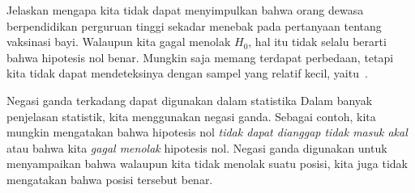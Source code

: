 \begin{examplewrap}
\begin{nexample}{Jelaskan mengapa kita tidak dapat menyimpulkan bahwa
    orang dewasa berpendidikan perguruan tinggi sekadar menebak pada
    pertanyaan tentang vaksinasi bayi.}
  Walaupun kita gagal menolak $H_0$, hal itu tidak
  selalu berarti bahwa hipotesis nol benar.
  Mungkin saja memang terdapat perbedaan,
  tetapi kita tidak dapat mendeteksinya dengan
  sampel yang relatif kecil, yaitu~\roslingAsize{}.

\end{nexample}
\end{examplewrap}

\begin{onebox}{Negasi ganda terkadang dapat digunakan dalam statistika}
  Dalam banyak penjelasan statistik, kita menggunakan negasi ganda.
  Sebagai contoh, kita mungkin mengatakan bahwa hipotesis nol
  \emph{tidak dapat dianggap tidak masuk akal} atau bahwa kita \emph{gagal menolak}
  hipotesis nol.
  Negasi ganda digunakan untuk menyampaikan bahwa walaupun kita
  tidak menolak suatu posisi, kita juga tidak mengatakan bahwa posisi tersebut
  benar.
\end{onebox}

